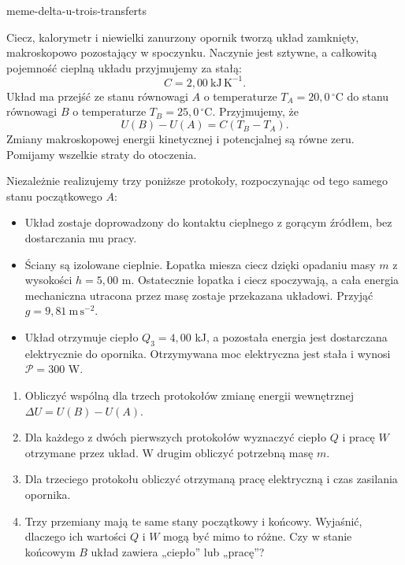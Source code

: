 \begin{exo}{meme-delta-u-trois-transferts}

Ciecz, kalorymetr i niewielki zanurzony opornik tworzą układ zamknięty,
makroskopowo pozostający w spoczynku. Naczynie jest sztywne, a całkowitą
pojemność cieplną układu przyjmujemy za stałą:
\[C=2{,}00\ \mathrm{kJ\,K^{-1}}.\]
Układ ma przejść ze stanu równowagi $A$ o temperaturze
$T_A=20{,}0\,^\circ\mathrm{C}$ do stanu równowagi $B$ o temperaturze
$T_B=25{,}0\,^\circ\mathrm{C}$. Przyjmujemy, że
\[U(B)-U(A)=C(T_B-T_A).\]
Zmiany makroskopowej energii kinetycznej i potencjalnej są równe zeru.
Pomijamy wszelkie straty do otoczenia.

Niezależnie realizujemy trzy poniższe protokoły, rozpoczynając od tego samego
stanu początkowego $A$:
\begin{itemize}
\item[Protokół 1] Układ zostaje doprowadzony do kontaktu cieplnego z gorącym źródłem, bez dostarczania mu pracy.
\item[Protokół 2] Ściany są izolowane cieplnie. Łopatka miesza ciecz dzięki opadaniu masy $m$ z wysokości $h=5{,}00$ m. Ostatecznie łopatka i ciecz spoczywają, a cała energia mechaniczna utracona przez masę zostaje przekazana układowi. Przyjąć $g=9{,}81\ \mathrm{m\,s^{-2}}$.
\item[Protokół 3] Układ otrzymuje ciepło $Q_3=4{,}00$ kJ, a pozostała energia jest dostarczana elektrycznie do opornika. Otrzymywana moc elektryczna jest stała i wynosi $\mathcal P=300$ W.
\end{itemize}

\begin{enumerate}
\item Obliczyć wspólną dla trzech protokołów zmianę energii wewnętrznej $\Delta U=U(B)-U(A)$.
\item Dla każdego z dwóch pierwszych protokołów wyznaczyć ciepło $Q$ i pracę $W$ otrzymane przez układ. W drugim obliczyć potrzebną masę $m$.
\item Dla trzeciego protokołu obliczyć otrzymaną pracę elektryczną i czas zasilania opornika.
\item Trzy przemiany mają te same stany początkowy i końcowy. Wyjaśnić, dlaczego ich wartości $Q$ i $W$ mogą być mimo to różne. Czy w stanie końcowym $B$ układ zawiera „ciepło” lub „pracę”?
\end{enumerate}


\end{exo}
